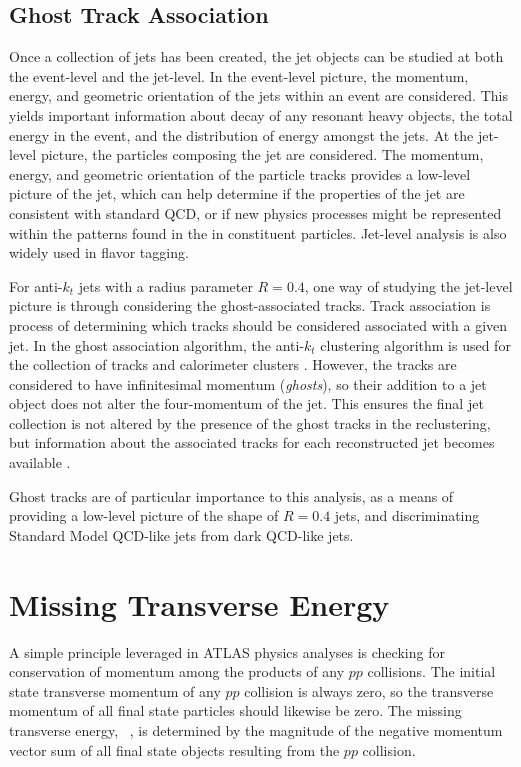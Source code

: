 \subsection{Ghost Track Association}
Once a collection of jets has been created, the jet objects can be studied at both the event-level and the jet-level. In the event-level picture, the momentum, energy, and geometric orientation of the jets within an event are considered. This yields important information about decay of any resonant heavy objects, the total energy in the event, and the distribution of energy amongst the jets. At the jet-level picture, the particles composing the jet are considered. The momentum, energy, and geometric orientation of the particle tracks provides a low-level picture of the jet, which can help determine if the properties of the jet are consistent with standard QCD, or if new physics processes might be represented within the patterns found in the in constituent particles. Jet-level analysis is also widely used in flavor tagging. \par

For anti-$k_t$ jets with a radius parameter $R=0.4$, one way of studying the jet-level picture is through considering the ghost-associated tracks. Track association is process of determining which tracks should be considered associated with a given jet. In the ghost association algorithm, the anti-$k_t$ clustering algorithm is used for the collection of tracks and calorimeter clusters \cite{ghosts2}. However, the tracks are considered to have infinitesimal momentum (\textit{ghosts}), so their addition to a jet object does not alter the four-momentum of the jet. This ensures the final jet collection is not altered by the presence of the ghost tracks in the reclustering, but information about the associated tracks for each reconstructed jet becomes available \cite{ghosts1}. \par

Ghost tracks are of particular importance to this analysis, as a means of providing a low-level picture of the shape of $R=0.4$ jets, and discriminating Standard Model QCD-like jets from dark QCD-like jets. 

\section{Missing Transverse Energy}
A simple principle leveraged in ATLAS physics analyses is checking for conservation of momentum among the products of any $pp$ collisions. The initial state transverse momentum of any $pp$ collision is always zero, so the transverse momentum of all final state particles should likewise be zero. The missing transverse energy, \met~, is determined by the magnitude of the negative momentum vector sum of all final state objects resulting from the $pp$ collision. \par

